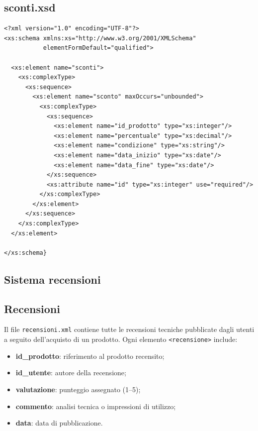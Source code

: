 \documentclass[a4paper,12pt]{report}
\begin{document}
\subsection*{sconti.xsd}
{\footnotesize
\begin{lstlisting}
<?xml version="1.0" encoding="UTF-8"?>
<xs:schema xmlns:xs="http://www.w3.org/2001/XMLSchema"
           elementFormDefault="qualified">

  <xs:element name="sconti">
    <xs:complexType>
      <xs:sequence>
        <xs:element name="sconto" maxOccurs="unbounded">
          <xs:complexType>
            <xs:sequence>
              <xs:element name="id_prodotto" type="xs:integer"/>
              <xs:element name="percentuale" type="xs:decimal"/>
              <xs:element name="condizione" type="xs:string"/>
              <xs:element name="data_inizio" type="xs:date"/>
              <xs:element name="data_fine" type="xs:date"/>
            </xs:sequence>
            <xs:attribute name="id" type="xs:integer" use="required"/>
          </xs:complexType>
        </xs:element>
      </xs:sequence>
    </xs:complexType>
  </xs:element>

</xs:schema}
\end{lstlisting}}



\subsection{Sistema recensioni}
\subsection*{Recensioni}
\label{sec:xml-recensioni}

Il file \texttt{recensioni.xml} contiene tutte le recensioni tecniche pubblicate
dagli utenti a seguito dell’acquisto di un prodotto.  
Ogni elemento \texttt{<recensione>} include:

\begin{itemize}
    \item \textbf{id\_prodotto}: riferimento al prodotto recensito;
    \item \textbf{id\_utente}: autore della recensione;
    \item \textbf{valutazione}: punteggio assegnato (1–5);
    \item \textbf{commento}: analisi tecnica o impressioni di utilizzo;
    \item \textbf{data}: data di pubblicazione.
\end{itemize}
\end{document}
